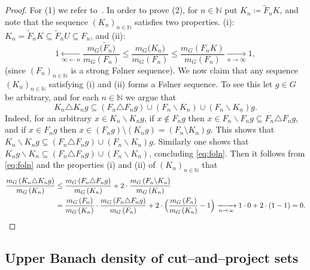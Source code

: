 \documentclass{amsart}
\numberwithin{equation}{subsection}
\theoremstyle{remark}
\begin{document}
\begin{proof}
For (1) we refer to~\cite[Lemma 2.8]{BjFi2024}. In order to prove (2), for \(n\in\mathbb{N}\) put \(K_{n}\coloneqq\widetilde{F}_{n}K\), and note that the sequence \(\left(K_{n}\right)_{n\in\mathbb{N}}\) satisfies two properties. (i): \(K_{n}=\widetilde{F}_{n}K\subseteq\widetilde{F}_{n}U\subseteq F_{n}\), and (ii):
\[1\xleftarrow[\infty\leftarrow n]{}\frac{m_{G}\big(\widetilde{F}_{n}\big)}{m_{G}\left(F_{n}\right)}\leq\frac{m_{G}\big(K_{n}\big)}{m_{G}\left(F_{n}\right)}\leq\frac{m_{G}\left(F_{n}K\right)}{m_{G}\left(F_{n}\right)}\xrightarrow[n\to\infty]{}1,\]
(since \(\left(F_{n}\right)_{n\in\mathbb{N}}\) is a strong F\o lner sequence). We now claim that any sequence \(\left(K_{n}\right)_{n\in\mathbb{N}}\) satisfying (i) and (ii) forms a F\o lner sequence. To see this let \(g\in G\) be arbitrary, and for each \(n\in\mathbb{N}\) we argue that
\begin{equation}\label{eq:foln}
K_{n}\triangle K_{n}g\subseteq\left(F_{n}\triangle F_{n}g\right)\cup\left(F_{n}\backslash K_{n}\right)\cup\left(F_{n}\backslash K_{n}\right)g.
\end{equation}
Indeed, for an arbitrary \(x\in K_{n}\backslash K_{n}g\), if \(x\notin F_{n}g\) then \(x\in F_{n}\backslash F_{n}g\subseteq F_{n}\triangle F_{n}g\), and if \(x\in F_{n}g\) then \(x\in\left(F_{n}g\right)\setminus\left(K_{n}g\right)=\left(F_{n}\setminus K_{n}\right)g\). This shows that \(K_{n}\backslash K_{n}g\subseteq\left(F_{n}\triangle F_{n}g\right)\cup\left(F_{n}\backslash K_{n}\right)g\). Similarly one shows that \(K_{n}g\backslash K_{n}\subseteq\left(F_{n}\triangle F_{n}g\right)\cup\left(F_{n}\backslash K_{n}\right)\), concluding \eqref{eq:foln}. Then it follows from \eqref{eq:foln} and the properties (i) and (ii) of \(\left(K_{n}\right)_{n\in\mathbb{N}}\) that
\begin{align*}
\frac{m_{G}\left(K_{n}\triangle K_{n}g\right)}{m_{G}\left(K_{n}\right)}
&\leq\frac{m_{G}\left(F_{n}\triangle F_{n}g\right)}{m_{G}\left(K_{n}\right)}+2\cdot\frac{m_{G}\left(F_{n}\backslash K_{n}\right)}{m_{G}\left(K_{n}\right)}\\
&=\frac{m_{G}\left(F_{n}\right)}{m_{G}\left(K_{n}\right)}\cdot\frac{m_{G}\left(F_{n}\triangle F_{n}g\right)}{m_{G}\left(F_{n}\right)}+2\cdot\Big(\frac{m_{G}\left(F_{n}\right)}{m_{G}\left(K_{n}\right)}-1\Big)\xrightarrow[n\to\infty]{}1\cdot0+2\cdot\left(1-1\right)=0.\qedhere
\end{align*}
\end{proof}

\subsection{Upper Banach density of cut--and--project sets}
\end{document}
